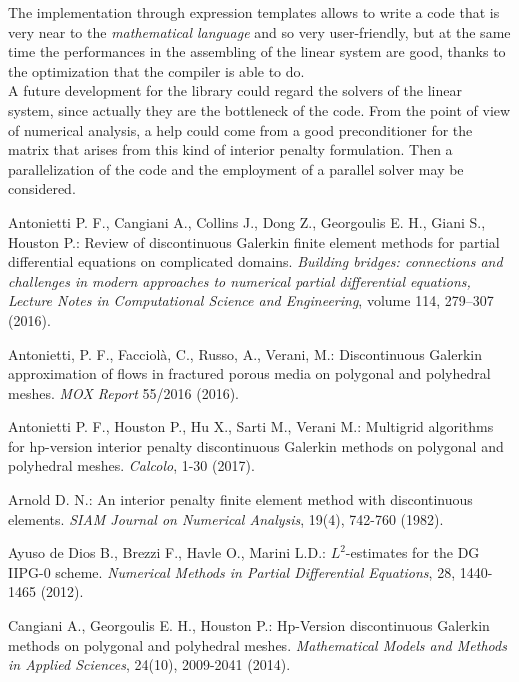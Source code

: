 \documentclass[12pt, a4paper]{article}
\theoremstyle{definition}
\theoremstyle{plain}
\theoremstyle{plain}
\theoremstyle{definition}
\begin{document}
The implementation through expression templates allows to write a code that is
very near to the \emph{mathematical language} and so very user-friendly, but at 
the same time the performances in the assembling of the linear system are good,
thanks to the optimization that the compiler is able to do.\\
A future development for the library could regard the solvers of the linear 
system, since 
actually they are the bottleneck of the code. From the point of view of 
numerical analysis, a help could come from a good preconditioner for the matrix
that arises from this kind of interior penalty formulation. Then a 
parallelization of the code and the employment of a parallel solver may be 
considered. 
\begin{thebibliography}{99}\label{sec:bib}
	Antonietti P. F., Cangiani  A., Collins J., Dong Z., Georgoulis E. H., Giani S., Houston P.: Review of discontinuous Galerkin finite element methods for partial differential equations on complicated domains. \emph{Building bridges: connections and challenges in modern approaches to numerical partial differential equations, Lecture Notes in Computational Science and Engineering}, volume 114, 279–307 (2016).
	
	Antonietti, P. F., Facciolà, C., Russo, A., Verani, M.: Discontinuous Galerkin approximation of flows in fractured porous media on polygonal and polyhedral meshes. \emph{MOX Report} 55/2016 (2016).
	
	Antonietti P. F., Houston  P., Hu  X., Sarti  M., Verani M.: Multigrid 
	algorithms for hp-version interior penalty discontinuous Galerkin methods 
	on polygonal and polyhedral meshes. \emph{Calcolo}, 1-30 (2017).
	
	Arnold D. N.: An interior penalty finite element method with discontinuous 
	elements. \emph{SIAM Journal on Numerical Analysis}, 19(4), 742-760 (1982).
	
	Ayuso de Dios B., Brezzi F., Havle O., Marini L.D.: $L^2$-estimates for the 
	DG IIPG-0 scheme. \emph{Numerical Methods in Partial Differential 
	Equations}, 28, 1440-1465 (2012).
	
	Cangiani A., Georgoulis E. H., Houston P.: Hp-Version discontinuous 
	Galerkin methods on polygonal and polyhedral meshes. \emph{Mathematical 
	Models and Methods in Applied Sciences}, 24(10), 2009-2041 (2014).
	

\end{thebibliography}
\end{document}
